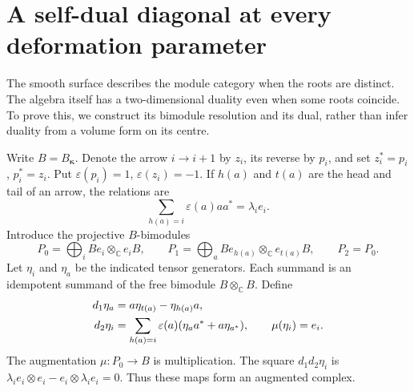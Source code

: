 \section{A self-dual diagonal at every deformation parameter}

The smooth surface describes the module category when the roots are
distinct. The algebra itself has a two-dimensional duality even when
some roots coincide. To prove this, we construct its bimodule resolution
and its dual, rather than infer duality from a volume form on its centre.

Write \(B=B_{\boldsymbol\kappa}\). Denote the arrow \(i\to i+1\)
by \(z_i\), its reverse by \(p_i\), and set
\(z_i^*=p_i\), \(p_i^*=z_i\).
Put \(\varepsilon(p_i)=1\), \(\varepsilon(z_i)=-1\).
If \(h(a)\) and \(t(a)\) are the head and tail of an arrow, the
relations are
\[
 \sum_{h(a)=i}\varepsilon(a)aa^*=\lambda_i e_i.
\]
Introduce the projective \(B\)-bimodules
\[
 P_0=\bigoplus_i Be_i\otimes_{\mathbb C}e_iB,\qquad
 P_1=\bigoplus_a Be_{h(a)}\otimes_{\mathbb C}e_{t(a)}B,\qquad
 P_2=P_0.
\]
Let \(\eta_i\) and \(\eta_a\) be the indicated tensor generators.
Each summand is an idempotent summand of the free bimodule
\(B\otimes_{\mathbb C}B\). Define
\begin{align}\label{eq:cs-diagonal}
 d_1\eta_a&=a\eta_{t(a)}-\eta_{h(a)}a,\\
 d_2\eta_i&=\sum_{h(a)=i}\varepsilon(a)
                      (\eta_a a^*+a\eta_{a^*}),\qquad
 \mu(\eta_i)=e_i.\notag
\end{align}
The augmentation \(\mu:P_0\to B\) is multiplication.
The square \(d_1d_2\eta_i\) is
\(\lambda_i e_i\otimes e_i-e_i\otimes\lambda_i e_i=0\).
Thus these maps form an augmented complex.

